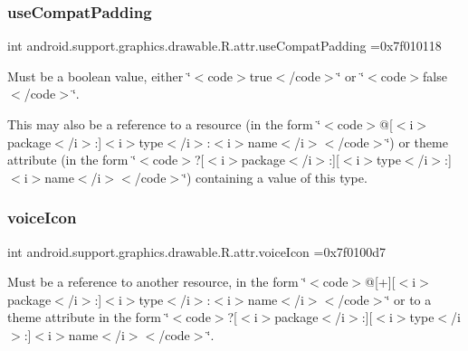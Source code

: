 \subsubsection{\texorpdfstring{use\+Compat\+Padding}{useCompatPadding}}
{\footnotesize\ttfamily int android.\+support.\+graphics.\+drawable.\+R.\+attr.\+use\+Compat\+Padding =0x7f010118\hspace{0.3cm}{\ttfamily [static]}}

Must be a boolean value, either \char`\"{}$<$code$>$true$<$/code$>$\char`\"{} or \char`\"{}$<$code$>$false$<$/code$>$\char`\"{}. 

This may also be a reference to a resource (in the form \char`\"{}$<$code$>$@\mbox{[}$<$i$>$package$<$/i$>$\+:\mbox{]}$<$i$>$type$<$/i$>$\+:$<$i$>$name$<$/i$>$$<$/code$>$\char`\"{}) or theme attribute (in the form \char`\"{}$<$code$>$?\mbox{[}$<$i$>$package$<$/i$>$\+:\mbox{]}\mbox{[}$<$i$>$type$<$/i$>$\+:\mbox{]}$<$i$>$name$<$/i$>$$<$/code$>$\char`\"{}) containing a value of this type. \mbox{\label{classandroid_1_1support_1_1graphics_1_1drawable_1_1R_1_1attr_aae5efa527fb557e24819241828b45d9b}} 
\subsubsection{\texorpdfstring{voice\+Icon}{voiceIcon}}
{\footnotesize\ttfamily int android.\+support.\+graphics.\+drawable.\+R.\+attr.\+voice\+Icon =0x7f0100d7\hspace{0.3cm}{\ttfamily [static]}}

Must be a reference to another resource, in the form \char`\"{}$<$code$>$@\mbox{[}+\mbox{]}\mbox{[}$<$i$>$package$<$/i$>$\+:\mbox{]}$<$i$>$type$<$/i$>$\+:$<$i$>$name$<$/i$>$$<$/code$>$\char`\"{} or to a theme attribute in the form \char`\"{}$<$code$>$?\mbox{[}$<$i$>$package$<$/i$>$\+:\mbox{]}\mbox{[}$<$i$>$type$<$/i$>$\+:\mbox{]}$<$i$>$name$<$/i$>$$<$/code$>$\char`\"{}. \mbox{\label{classandroid_1_1support_1_1graphics_1_1drawable_1_1R_1_1attr_a5e63de2c332366153263975d36d9bb0c}} 
